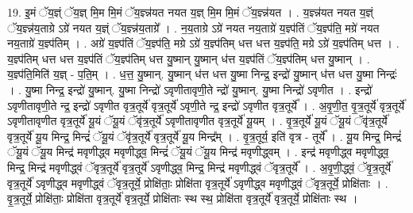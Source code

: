 \documentclass[17pt]{extarticle}
\begin{document}
19. इ॒मं ॅय॒ज्ञ्ं ॅय॒ज्ञ् मि॒म मि॒मं ॅय॒ज्ञ्न्न॑यत नयत य॒ज्ञ् मि॒म मि॒मं ॅय॒ज्ञ्न्न॑यत । . य॒ज्ञ्न्न॑यत नयत य॒ज्ञ्ं ॅय॒ज्ञ्न्न॑य॒ताग्रे ऽग्रे॑ नयत य॒ज्ञ्ं ॅय॒ज्ञ्न्न॑य॒ताग्रे᳚ । . न॒य॒ताग्रे ऽग्रे॑ नयत नय॒ताग्रे॑ य॒ज्ञ्प॑तिं ॅय॒ज्ञ्प॑ति॒ मग्रे॑ नयत नय॒ताग्रे॑ य॒ज्ञ्प॑तिम् । . अग्रे॑ य॒ज्ञ्प॑तिं ॅय॒ज्ञ्प॑ति॒ मग्रे ऽग्रे॑ य॒ज्ञ्प॑तिम् धत्त धत्त य॒ज्ञ्प॑ति॒ मग्रे ऽग्रे॑ य॒ज्ञ्प॑तिम् धत्त । . य॒ज्ञ्प॑तिम् धत्त धत्त य॒ज्ञ्प॑तिं ॅय॒ज्ञ्प॑तिम् धत्त यु॒ष्मान् यु॒ष्मान् ध॑त्त य॒ज्ञ्प॑तिं ॅय॒ज्ञ्प॑तिम् धत्त यु॒ष्मान् । . य॒ज्ञ्प॑ति॒मिति॑ य॒ज्ञ् - प॒ति॒म् । . ध॒त्त॒ यु॒ष्मान्. यु॒ष्मान् ध॑त्त धत्त यु॒ष्मा निन्द्र॒ इन्द्रो॑ यु॒ष्मान् ध॑त्त धत्त यु॒ष्मा निन्द्रः॑ । . यु॒ष्मा निन्द्र॒ इन्द्रो॑ यु॒ष्मान्. यु॒ष्मा निन्द्रो॑ ऽवृणीतावृणी॒ते न्द्रो॑ यु॒ष्मान्. यु॒ष्मा निन्द्रो॑ ऽवृणीत । . इन्द्रो॑ ऽवृणीतावृणी॒ते न्द्र॒ इन्द्रो॑ ऽवृणीत वृत्र॒तूर्ये॑ वृत्र॒तूर्ये॑ ऽवृणी॒ते न्द्र॒ इन्द्रो॑ ऽवृणीत वृत्र॒तूर्ये᳚ । . अ॒वृ॒णी॒त॒ वृ॒त्र॒तूर्ये॑ वृत्र॒तूर्ये॑ ऽवृणीतावृणीत वृत्र॒तूर्ये॑ यू॒यं ॅयू॒यं ॅवृ॑त्र॒तूर्ये॑ ऽवृणीतावृणीत वृत्र॒तूर्ये॑ यू॒यम् । . वृ॒त्र॒तूर्ये॑ यू॒यं ॅयू॒यं ॅवृ॑त्र॒तूर्ये॑ वृत्र॒तूर्ये॑ यू॒य मिन्द्र॒ मिन्द्रं॑ ॅयू॒यं ॅवृ॑त्र॒तूर्ये॑ वृत्र॒तूर्ये॑ यू॒य मिन्द्र᳚म् । . वृ॒त्र॒तूर्य॒ इति॑ वृत्र - तूर्ये᳚ । . यू॒य मिन्द्र॒ मिन्द्रं॑ ॅयू॒यं ॅयू॒य मिन्द्र॑ मवृणीद्ध्व मवृणीद्ध्व॒ मिन्द्रं॑ ॅयू॒यं ॅयू॒य मिन्द्र॑ मवृणीद्ध्वम् । . इन्द्र॑ मवृणीद्ध्व मवृणीद्ध्व॒ मिन्द्र॒ मिन्द्र॑ मवृणीद्ध्वं ॅवृत्र॒तूर्ये॑ वृत्र॒तूर्ये॑ ऽवृणीद्ध्व॒ 
मिन्द्र॒ मिन्द्र॑ मवृणीद्ध्वं ॅवृत्र॒तूर्ये᳚ । . अ॒वृ॒णी॒द्ध्वं॒ ॅवृ॒त्र॒तूर्ये॑ वृत्र॒तूर्ये॑ ऽवृणीद्ध्व मवृणीद्ध्वं ॅवृत्र॒तूर्ये॒ प्रोक्षि॑ताः॒ प्रोक्षि॑ता वृत्र॒तूर्ये॑ ऽवृणीद्ध्व मवृणीद्ध्वं ॅवृत्र॒तूर्ये॒ प्रोक्षि॑ताः । . वृ॒त्र॒तूर्ये॒ प्रोक्षि॑ताः॒ प्रोक्षि॑ता वृत्र॒तूर्ये॑ वृत्र॒तूर्ये॒ प्रोक्षि॑ताः स्थ स्थ॒ प्रोक्षि॑ता वृत्र॒तूर्ये॑ वृत्र॒तूर्ये॒ प्रोक्षि॑ताः स्थ । \newline
\end{document}
